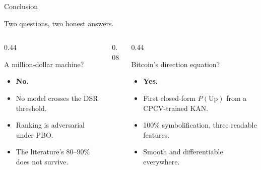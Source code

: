 \documentclass[aspectratio=169, t]{beamer}
\begin{document}
\begin{frame}{Conclusion}
\vspace{-0.8em}

\begin{center}
{\footnotesize Two questions, two honest answers.}
\end{center}

\vspace{0.5em}

\begin{columns}[T]
\begin{column}{0.44\textwidth}
{
\begin{block}{\small A million-dollar machine?}
\scriptsize
\begin{itemize}\setlength{\itemsep}{3pt}
  \item \textbf{No.}
  \item No model crosses the DSR threshold.
  \item Ranking is adversarial under PBO.
  \item The literature's 80--90\% does not survive.
\end{itemize}
\end{block}
}
\end{column}

\begin{column}{0.08\textwidth}\hfill\end{column}

\begin{column}{0.44\textwidth}
{
\begin{block}{\small Bitcoin's direction equation?}
\scriptsize
\begin{itemize}\setlength{\itemsep}{3pt}
  \item \textbf{Yes.}
  \item First closed-form $P(\mathrm{Up})$ from a CPCV-trained KAN.
  \item 100\% symbolification, three readable features.
  \item Smooth and differentiable everywhere.
\end{itemize}
\end{block}
}
\end{column}
\end{columns}


\end{frame}
\end{document}
